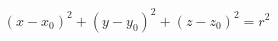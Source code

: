 \documentclass[12pt]{article}
\begin{document}
\[
    (x - x_0)^2 + (y - y_0)^2 + (z - z_0)^2 = r^2
\]
\end{document}

